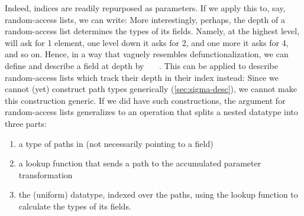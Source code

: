 \begin{appendix}
Indeed, indices are readily repurposed as parameters. If we apply this to, say, random-access lists, we can write:
More interestingly, perhaps, the depth of a random-access list determines the types of its fields. Namely, at the highest level,  will ask for 1 element, one level down it asks for 2, and one more it asks for 4, and so on. Hence, in a way that vaguely resembles defunctionalization, we can define
and describe a field at depth  by \ \ \ . This can be applied to describe random-access lists which track their depth in their index instead:
Since we cannot (yet) construct path types generically (\autoref{sec:sigma-desc}), we cannot make this construction generic. If we did have such constructions, the argument for random-access lists generalizes to an operation that splits a nested datatype  into three parts:
\begin{enumerate}
    \item a type of paths in  (not necessarily pointing to a field)
    \item a lookup function that sends a path to the accumulated parameter transformation
    \item the (uniform) datatype, indexed over the paths, using the lookup function to calculate the types of its fields.
\end{enumerate}
\end{appendix}